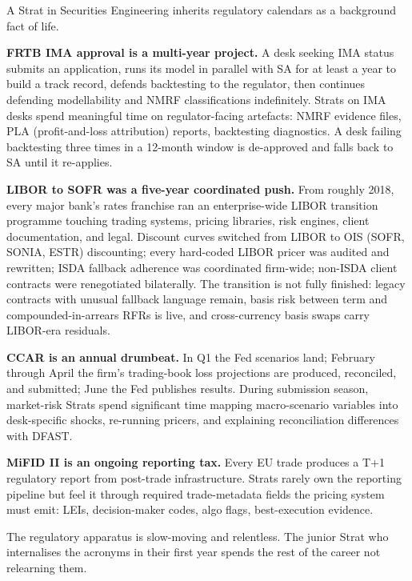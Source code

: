 \begin{gsbox}[title={Regulation in a Strat's calendar}]
A Strat in Securities Engineering inherits regulatory calendars
as a background fact of life.

\textbf{FRTB IMA approval is a multi-year project.}  A desk
seeking IMA status submits an application, runs its model in
parallel with SA for at least a year to build a track record,
defends backtesting to the regulator, then continues defending
modellability and NMRF classifications indefinitely.  Strats on
IMA desks spend meaningful time on regulator-facing artefacts:
NMRF evidence files, PLA (profit-and-loss attribution) reports,
backtesting diagnostics.  A desk failing backtesting three times
in a 12-month window is de-approved and falls back to SA until
it re-applies.

\textbf{LIBOR to SOFR was a five-year coordinated push.}  From
roughly 2018, every major bank's rates franchise ran an
enterprise-wide LIBOR transition programme touching trading
systems, pricing libraries, risk engines, client documentation,
and legal.  Discount curves switched from LIBOR to OIS (SOFR,
SONIA, ESTR) discounting; every hard-coded LIBOR pricer was
audited and rewritten; ISDA fallback adherence was coordinated
firm-wide; non-ISDA client contracts were renegotiated
bilaterally.  The transition is not fully finished: legacy
contracts with unusual fallback language remain, basis risk
between term and compounded-in-arrears RFRs is live, and
cross-currency basis swaps carry LIBOR-era residuals.

\textbf{CCAR is an annual drumbeat.}  In Q1 the Fed scenarios
land; February through April the firm's trading-book loss
projections are produced, reconciled, and submitted; June the
Fed publishes results.  During submission season, market-risk
Strats spend significant time mapping macro-scenario variables
into desk-specific shocks, re-running pricers, and explaining
reconciliation differences with DFAST.

\textbf{MiFID II is an ongoing reporting tax.}  Every EU trade
produces a T+1 regulatory report from post-trade infrastructure.
Strats rarely own the reporting pipeline but feel it through
required trade-metadata fields the pricing system must emit:
LEIs, decision-maker codes, algo flags, best-execution evidence.

The regulatory apparatus is slow-moving and relentless.  The
junior Strat who internalises the acronyms in their first year
spends the rest of the career not relearning them.
\end{gsbox}


